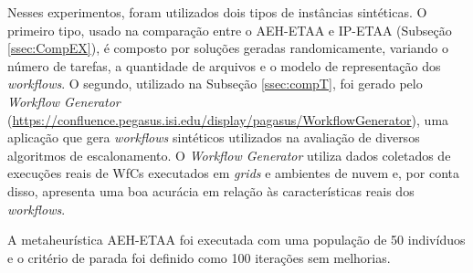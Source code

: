 	
Nesses experimentos, foram utilizados dois tipos de instâncias sintéticas. O primeiro tipo, usado na comparação entre o AEH-ETAA e IP-ETAA (Subseção \ref{ssec:CompEX}), é composto por soluções geradas randomicamente, variando o número de tarefas, a quantidade de arquivos e o modelo de representação dos \textit{workflows}. O segundo, utilizado na Subseção \ref{ssec:compT}, foi gerado pelo \textit{Workflow Generator} \cite{Silva2014} (\url{https://confluence.pegasus.isi.edu/display/pagasus/WorkflowGenerator}), uma aplicação que gera \textit{workflows} sintéticos utilizados na avaliação de diversos algoritmos de escalonamento. O \textit{Workflow Generator} utiliza dados coletados de execuções reais de WfCs executados em \textit{grids} e ambientes de nuvem e, por conta disso, apresenta uma boa acurácia em relação às características reais dos \textit{workflows}.

	
A metaheurística AEH-ETAA foi executada com uma população de 50 indivíduos e o critério de parada foi definido como 100 iterações sem melhorias.

	


